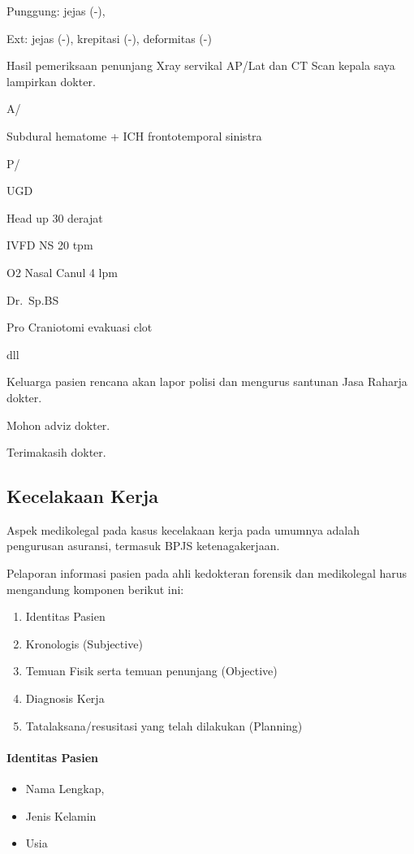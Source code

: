 \documentclass[
]{book}
\begin{document}
Punggung: jejas (-),

Ext: jejas (-), krepitasi (-), deformitas (-)

Hasil pemeriksaan penunjang Xray servikal AP/Lat dan CT Scan kepala saya lampirkan dokter.

A/

Subdural hematome + ICH frontotemporal sinistra

P/

UGD

Head up 30 derajat

IVFD NS 20 tpm

O2 Nasal Canul 4 lpm

Dr.~Sp.BS

Pro Craniotomi evakuasi clot

dll

Keluarga pasien rencana akan lapor polisi dan mengurus santunan Jasa Raharja dokter.

Mohon adviz dokter.

Terimakasih dokter.

\hypertarget{kecelakaan-kerja}{%
\subsection{Kecelakaan Kerja}\label{kecelakaan-kerja}}

Aspek medikolegal pada kasus kecelakaan kerja pada umumnya adalah pengurusan asuransi, termasuk BPJS ketenagakerjaan.

Pelaporan informasi pasien pada ahli kedokteran forensik dan medikolegal harus mengandung komponen berikut ini:

\begin{enumerate}
\def\labelenumi{\arabic{enumi}.}
\item
  Identitas Pasien
\item
  Kronologis (Subjective)
\item
  Temuan Fisik serta temuan penunjang (Objective)
\item
  Diagnosis Kerja
\item
  Tatalaksana/resusitasi yang telah dilakukan (Planning)
\end{enumerate}

\hypertarget{identitas-pasien-2}{%
\paragraph{Identitas Pasien}\label{identitas-pasien-2}}

\begin{itemize}
\item
  Nama Lengkap,
\item
  Jenis Kelamin
\item
  Usia
\end{itemize}
\end{document}

